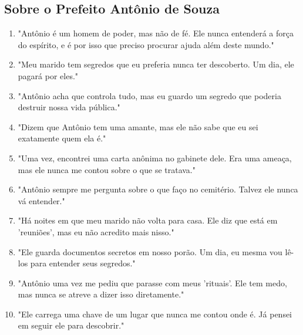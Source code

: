 \subsection*{Sobre o Prefeito Antônio de Souza}
\begin{enumerate}
    \item "Antônio é um homem de poder, mas não de fé. Ele nunca entenderá a força do espírito, e é por isso que preciso procurar ajuda além deste mundo."
    \item "Meu marido tem segredos que eu preferia nunca ter descoberto. Um dia, ele pagará por eles."
    \item "Antônio acha que controla tudo, mas eu guardo um segredo que poderia destruir nossa vida pública."
    \item "Dizem que Antônio tem uma amante, mas ele não sabe que eu sei exatamente quem ela é."
    \item "Uma vez, encontrei uma carta anônima no gabinete dele. Era uma ameaça, mas ele nunca me contou sobre o que se tratava."
    \item "Antônio sempre me pergunta sobre o que faço no cemitério. Talvez ele nunca vá entender."
    \item "Há noites em que meu marido não volta para casa. Ele diz que está em 'reuniões', mas eu não acredito mais nisso."
    \item "Ele guarda documentos secretos em nosso porão. Um dia, eu mesma vou lê-los para entender seus segredos."
    \item "Antônio uma vez me pediu que parasse com meus 'rituais'. Ele tem medo, mas nunca se atreve a dizer isso diretamente."
    \item "Ele carrega uma chave de um lugar que nunca me contou onde é. Já pensei em seguir ele para descobrir."
\end{enumerate}

